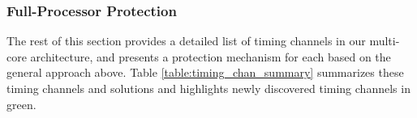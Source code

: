 %

\subsubsection{Full-Processor Protection}


The rest of this section provides a detailed list of timing channels in our  
multi-core architecture, and presents a protection mechanism for each 
based on the general approach above.
Table \ref{table:timing_chan_summary} summarizes these timing channels and
solutions and highlights newly discovered timing channels in green.

